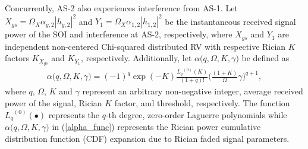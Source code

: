 Concurrently, AS-2 also experiences interference from AS-1. Let $X_{gs} = \Omega_{X}\alpha_{g,2}|h_{g,2}|^2$ and $Y_{1}=\Omega_{X}\alpha_{1,2}|h_{1,2}|^2$ be the instantaneous received signal power of the SOI and interference at AS-2, respectively, where $X_{gs}$ and $Y_{1}$ are independent non-centered Chi-squared distributed RV with respective Rician $K$ factors $K_{X_{gs}}$ and $K_{Y_1}$, respectively. Additionally, let $\alpha\big(q,\Omega,K,\gamma\big)$ be defined as
\begin{eqnarray} \label{alpha_func}
\alpha\big(q,\Omega,K,\gamma\big) = (-1)^q \exp(-K) \frac{{L_q}^{(0)}(K)}{(1+q)!} \Bigg(\frac{(1+K)}{\Omega}\gamma\Bigg)^{q+1},
\end{eqnarray}
where $q$, $\Omega$, $K$ and $\gamma$ represent an arbitrary non-negative integer, average received power of the signal, Rician $K$ factor, and threshold, respectively. The function ${L_q}^{(0)}(\bullet)$ represents the $q$-th degree, zero-order Laguerre polynomials \cite{andras2011generalized} while $\alpha\big(q,\Omega,K,\gamma\big)$ in (\ref{alpha_func}) represents the Rician power cumulative distribution function (CDF) expansion due to Rician faded signal parameters. 

